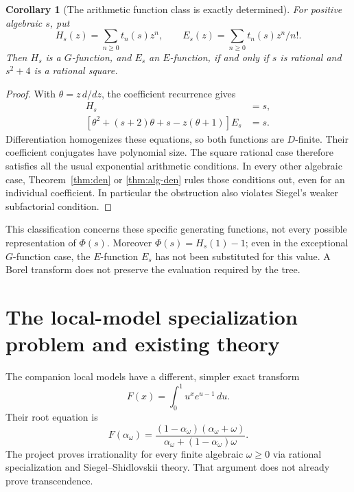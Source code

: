 \documentclass[11pt]{article}
\newtheorem{corollary}[theorem]{Corollary}
\theoremstyle{remark}
\begin{document}
\begin{corollary}[The arithmetic function class is exactly determined]
\label{cor:classes}
For positive algebraic $s$, put
\[
 H_s(z)=\sum_{n\ge0}t_n(s)z^n,\qquad
 E_s(z)=\sum_{n\ge0}t_n(s)z^n/n!.
\]
Then $H_s$ is a $G$-function, and $E_s$ an $E$-function, if and only
if $s$ is rational and $s^2+4$ is a rational square.
\end{corollary}
\begin{proof}
With $\theta=z\,d/dz$, the coefficient recurrence gives
\begin{align*}
 [\theta^2+(s+2)\theta+s-z(\theta+1)^2]H_s&=s,\\
 [\theta^2+(s+2)\theta+s-z(\theta+1)]E_s&=s.
\end{align*}
Differentiation homogenizes these equations, so both functions are
$D$-finite. Their coefficient conjugates have polynomial size. The
square rational case therefore satisfies all the usual exponential
arithmetic conditions. In every other algebraic case,
Theorem~\ref{thm:den} or \ref{thm:alg-den} rules those conditions out,
even for an individual coefficient. In particular the obstruction also
violates Siegel's weaker subfactorial condition\cite{Beukers}.
\end{proof}

This classification concerns these specific generating functions, not
every possible representation of $\Phi(s)$. Moreover
$\Phi(s)=H_s(1)-1$; even in the exceptional $G$-function case, the
$E$-function $E_s$ has not been substituted for this value. A Borel
transform does not preserve the evaluation required by the tree.

\section{The local-model specialization problem and existing theory}

The companion local models have a different, simpler exact transform
\[
 F(x)=\int_0^1u^x e^{u-1}\,du.
\]
Their root equation is
\begin{equation}\label{eq:van}
 F(\alpha_\omega)=
 \frac{(1-\alpha_\omega)(\alpha_\omega+\omega)}
      {\alpha_\omega+(1-\alpha_\omega)\omega}.
\end{equation}
The project proves irrationality for every finite algebraic
$\omega\ge0$ via rational specialization and Siegel--Shidlovskii
theory\cite{Long,Beukers}. That argument does not already prove
transcendence.
\end{document}

